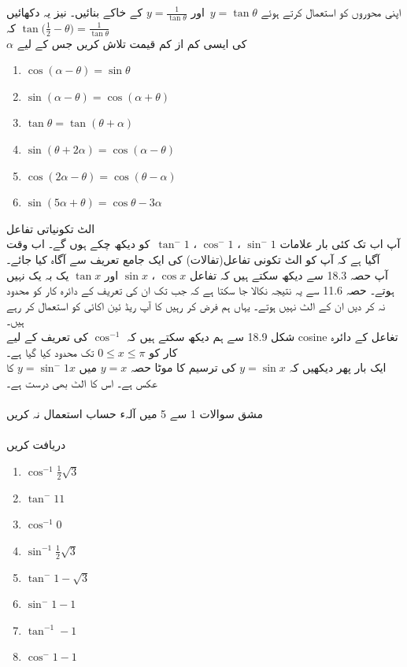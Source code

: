 اپنی محوروں کو استعمال کرتے ہوئے 
\(y=\tan\theta\)\
اور
 \(y=\frac{1}{\tan\theta}\)
کے خاکے بنائیں۔ نیز یہ دکھائیں کہ
\(\tan\Big(\frac{1}{2}-\theta\Big)=\frac{1}{\tan\theta}\)\\
\(\alpha\)
کی ایسی کم از کم قیمت تلاش کریں جس کے لیے\\
\begin{enumerate}
\item
\(\cos(\alpha-\theta)=\sin\theta\)
\item
\(\sin(\alpha-\theta)=\cos(\alpha+\theta)\)
\item
\(\tan\theta=\tan(\theta+\alpha)\)
\item
\(\sin(\theta+2\alpha)=\cos(\alpha-\theta)\)
\item
\(\cos(2\alpha-\theta)=\cos(\theta-\alpha)\)
\item
\(\sin(5\alpha+\theta)=\cos\theta-3\alpha\)
\end{enumerate}
الٹ تکونیاتی تفاعل\\
آپ اب تک کئی بار علامات
\(\sin^-1\)
، 
\(\cos^-1\)
، 
\(\tan^-1\)\
کو دیکھ چکے ہوں گے۔ اب وقت آگیا ہے کہ آپ کو الٹ تکونی تفاعل(تفالات) کی ایک جامع تعریف سے آگاہ کیا جائے۔\\
آپ حصہ 18.3 سے دیکھ سکتے ہیں کہ تفاعل
\(\cos x\)
، 
\(\sin x\)
اور 
 \(\tan x\)
یک بہ یک نہیں ہوتے۔ حصہ 11.6 سے یہ نتیجہ نکالا جا سکتا ہے کہ جب تک ان کی تعریف کے دائرہ کار کو محدود نہ کر دیں ان کے الٹ نہیں ہوتے۔ یہاں ہم فرض کر رہیں کا آپ ریڈ ئین اکائی کو استعمال کر رہے ہیں۔\\
شکل 18.9 سے ہم دیکھ سکتے ہیں کہ 
\(\cos^{-1}\)
کی تعریف کے لیے 
cosine
تغاعل کے دائرہ کار کو
\( 0\le x \le \pi\) 
تک محدود کیا گیا ہے۔\\
ایک بار پھر دیکھیں کہ
\(y=\sin{x}\) 
کی ترسیم کا موٹا حصہ 
\( y=x\) 
میں 
 \(y=\sin^-1 x \) 
کا عکس ہے۔
اس کا الٹ  بھی درست ہے۔\\
\\مشق
سوالات 1 سے 5 میں آلہء حساب استعمال نہ کریں\\
\\دریافت کریں
\begin{enumerate}
\item
\(\cos^{-1 }\frac{1}{2}\sqrt{3}\)
\item
\(\tan^-{1} 1\)
\item
\(\cos^{-1} 0 \)
\item
\(\sin^{-1} \frac{1}{2}\sqrt{3}\)
\item
\(\tan^-{1} -\sqrt{3}\)
\item
\(\sin^-{1}-1\)
\item
\(\tan^{-1} -1\)
\item
\(\cos^-{1} -1\)
\end{enumerate}
